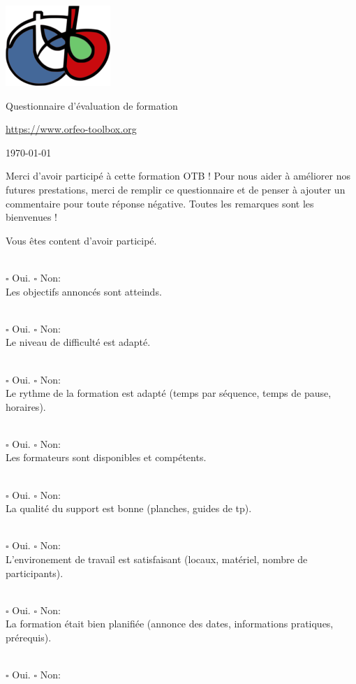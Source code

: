 \documentclass[10pt,a4paper]{article}
\newcommand{\answer}{
\\ \quad $\square$ Oui. \quad $\square$ Non:\\
}
\begin{document}
\begin{center}
\includegraphics[scale=0.5]{Art/otb-logo.png}

Questionnaire d'évaluation de formation

{\small\url{https://www.orfeo-toolbox.org}}

\today
\end{center}

\begin{center}
\begin{minipage}{.8\textwidth}
Merci d'avoir participé à cette formation OTB ! Pour nous aider à améliorer
nos futures prestations, merci de remplir ce questionnaire et de penser à
ajouter un commentaire pour toute réponse négative. Toutes les remarques
sont les bienvenues !
\end{minipage}
\end{center}

Vous êtes content d'avoir participé.
\answer

Les objectifs annoncés sont atteinds.
\answer

Le niveau de difficulté est adapté.
\answer

Le rythme de la formation est adapté (temps par séquence, temps de pause,
horaires).
\answer

Les formateurs sont disponibles et compétents.
\answer

La qualité du support est bonne (planches, guides de tp).
\answer

L'environement de travail est satisfaisant (locaux, matériel, nombre de
participants).
\answer

La formation était bien planifiée (annonce des dates, informations pratiques,
prérequis).
\answer

\newcommand{\moduleanswer}{
\\
\begin{tabular}{rlll}  
  Difficultée:         & $\square$ Adaptée & $\square$ Difficile & $\square$
  Facile\\
  Temps alloué:       & $\square$ Adapté  & $\square$ Manque de temps pour tout
  faire & $\square$ Manque de choses à faire\\
  Qualité du support: & $\square$ Bonne & $\square$ À améliorer: & \\
  Commentaire: &&&\\
  &&&\\
  &&&\\
\end{tabular}
}
\end{document}
